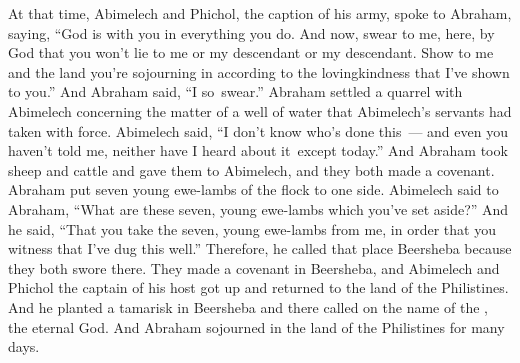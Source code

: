 \begin{inparaenum}
   At that time, Abimelech and Phichol, the caption of his army, spoke to Abraham, saying, ``God is with you in everything you do.%
   And now, swear to me, here, by God that you won't lie to me or my descendant or my descendant. Show to me and the land you're sojourning in according to the lovingkindness that I've shown to you.''%
   And Abraham said, ``I so\understood{}\ swear.''%
   Abraham settled a quarrel with Abimelech concerning the matter of a well of water that Abimelech's servants had taken with force.%
   Abimelech said, ``I don't know who's done this~--- and even you haven't told me, neither have I heard {about it}\understood{}\ except today.''%
   And Abraham took sheep and cattle and gave them to Abimelech, and they both made a covenant.%
   Abraham put seven young ewe-lambs of the flock to one side.%
   Abimelech said to Abraham, ``What are these seven, young ewe-lambs which you've set aside?''%
   And he said, ``That you take the seven, young ewe-lambs from me, in order that you witness that I've dug this well.''%
   Therefore, he called that place Beersheba because they both swore there.%
   They made a covenant in Beersheba, and Abimelech and Phichol the captain of his host got up and returned to the land of the Philistines.%
   And he planted a tamarisk in Beersheba and there called on the name of the \lord, the eternal God.%
   And Abraham sojourned in the land of the Philistines for many days.%
\end{inparaenum}

